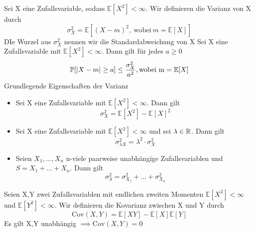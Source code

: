 \Def[4.22] Sei X eine Zufallsvariable, sodass \( \mathbb{E}[X^2] < \infty \). Wir definieren die Varianz von X durch \[ \sigma_X^2 = \mathbb{E}[(X-m)^2, \ \text{wobei} \ m=\mathbb{E}[X]]\] DIe Wurzel aus \(\sigma_X^2\) nennen wir die Standardabweichung von X
\Satz[4.24] \newline
Sei X eine Zufallsvariable mit \( \mathbb{E}[X^2] < \infty\). Dann gilt für jedes \( a \geq 0\) \[ \mathbb{P}[\left\lvert X -m \right\rvert \geq a] \leq \frac{\sigma_X^2}{a^2}, \text{wobei m} = \mathbb{E}[X]\]
\Satz[4.25] Grundlegende Eigenschaften der Varianz \newline
\begin{itemize}
    \item Sei X eine Zufallsvariable mit \( \mathbb{E}[X^2] < \infty \). Dann gilt \[ \sigma_X^2 = \mathbb{E}[X^2] - \mathbb{E}[X]^2\]
    \item Sei X eine Zufallsvariable mit \( \mathbb{E}[X^2] < \infty \) und sei \( \lambda \in \mathbb{R} \). Dann gilt \[ \sigma_{\lambda X}^2 = \lambda^2 \cdot \sigma_X^2\]
    \item Seien \(X_1, \dots , X_n \) n-viele paarweise unabhängige Zufallsvariablen und \(S = X_1 + \dots + X_n\). Dann gilt \[ \sigma_S^2 = \sigma_{X_1}^2 + \dots + \sigma_{X_n}^2\]
\end{itemize}
\Def[4.26] \newline
Seien X,Y zwei Zufallsvariablen mit endlichen zweiten Momenten \( \mathbb{E}[X^2] < \infty \) und \( \mathbb{E}[Y^2] < \infty \). Wir definieren die Kovarianz zwischen X und Y durch \[\text{Cov}(X,Y) = \mathbb{E}[XY]-\mathbb{E}[X]\mathbb{E}[Y]\]
\Bem[4.26A] \newline
Es gilt X,Y unabhängig \( \implies \text{Cov}(X,Y) = 0\)

